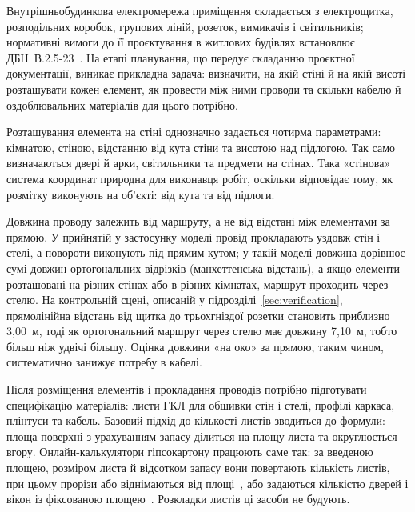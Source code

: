 


Внутрішньобудинкова електромережа приміщення складається з електрощитка, розподільних коробок, групових ліній, розеток, вимикачів і світильників; нормативні вимоги до її проєктування в житлових будівлях встановлює ДБН~В.2.5-23~. На етапі планування, що передує складанню проєктної документації, виникає прикладна задача: визначити, на якій стіні й на якій висоті розташувати кожен елемент, як провести між ними проводи та скільки кабелю й оздоблювальних матеріалів для цього потрібно.

Розташування елемента на стіні однозначно задається чотирма параметрами: кімнатою, стіною, відстанню від кута стіни та висотою над підлогою. Так само визначаються двері й арки, світильники та предмети на стінах. Така «стінова» система координат природна для виконавця робіт, оскільки відповідає тому, як розмітку виконують на об'єкті: від кута та від підлоги.

Довжина проводу залежить від маршруту, а не від відстані між елементами за прямою. У прийнятій у застосунку моделі провід прокладають уздовж стін і стелі, а повороти виконують під прямим кутом; у такій моделі довжина дорівнює сумі довжин ортогональних відрізків (манхеттенська відстань), а якщо елементи розташовані на різних стінах або в різних кімнатах, маршрут проходить через стелю. На контрольній сцені, описаній у підрозділі~\ref{sec:verification}, прямолінійна відстань від щитка до трьохгніздої розетки становить приблизно 3,00~м, тоді як ортогональний маршрут через стелю має довжину 7,10~м, тобто більш ніж удвічі більшу. Оцінка довжини «на око» за прямою, таким чином, систематично занижує потребу в кабелі.


Після розміщення елементів і прокладання проводів потрібно підготувати специфікацію матеріалів: листи ГКЛ для обшивки стін і стелі, профілі каркаса, плінтуси та кабель. Базовий підхід до кількості листів зводиться до формули: площа поверхні з урахуванням запасу ділиться на площу листа та округлюється вгору. Онлайн-калькулятори гіпсокартону працюють саме так: за введеною площею, розміром листа й відсотком запасу вони повертають кількість листів, при цьому прорізи або віднімаються від площі~, або задаються кількістю дверей і вікон із фіксованою площею~. Розкладки листів ці засоби не будують.


